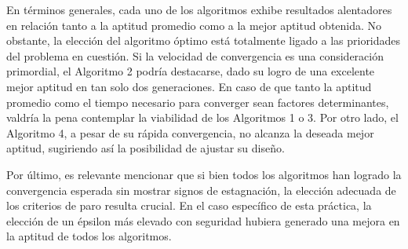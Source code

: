 En términos generales, cada uno de los algoritmos exhibe resultados alentadores en relación tanto a la aptitud promedio como a la mejor aptitud obtenida. No obstante, la elección del algoritmo óptimo está totalmente ligado a las prioridades del problema en cuestión. Si la velocidad de convergencia es una consideración primordial, el Algoritmo 2 podría destacarse, dado su logro de una excelente mejor aptitud en tan solo dos generaciones. En caso de que tanto la aptitud promedio como el tiempo necesario para converger sean factores determinantes, valdría la pena contemplar la viabilidad de los Algoritmos 1 o 3. Por otro lado, el Algoritmo 4, a pesar de su rápida convergencia, no alcanza la deseada mejor aptitud, sugiriendo así la posibilidad de ajustar su diseño.

Por último, es relevante mencionar que si bien todos los algoritmos han logrado la convergencia esperada sin mostrar signos de estagnación, la elección adecuada de los criterios de paro resulta crucial. En el caso específico de esta práctica, la elección de un épsilon más elevado con seguridad hubiera generado una mejora en la aptitud de todos los algoritmos.